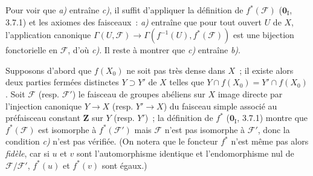 Pour voir que \emph{a)} entraîne \emph{c)}, il suffit d'appliquer la définition
de $f^*(\mathcal F)$ ($\mathbf 0_{\mathrm I}$, 3.7.1) et les axiomes des
faisceaux~: \emph{a)} entraîne que pour tout ouvert $U$ de $X$, l'application
canonique
$\Gamma(U,\mathcal F)\to\Gamma(f^{-1}(U),f^*(\mathcal F))$ est une bijection
fonctorielle en $\mathcal F$, d'où \emph{c)}. Il reste à montrer que
\emph{c)} entraîne \emph{b)}.

Supposons d'abord que $f(X_0)$ ne soit pas très dense dans $X$~; il existe
alors deux parties fermées distinctes $Y\supset Y'$ de $X$ telles que
$Y\cap f(X_0)=Y'\cap f(X_0)$. Soit $\mathcal F$ (resp. $\mathcal F'$) le
faisceau de groupes abéliens sur $X$ image directe par l'injection canonique
$Y\to X$ (resp. $Y'\to X$) du faisceau simple associé au préfaisceau constant
$\mathbf Z$ sur $Y$ (resp. $Y'$)~; la définition de $f^*$
($\mathbf 0_{\mathrm I}$, 3.7.1) montre que $f^*(\mathcal F)$ est isomorphe à
$f^*(\mathcal F')$ mais $\mathcal F$ n'est pas isomorphe à $\mathcal F'$,
donc la condition \emph{c)} n'est pas vérifiée. (On notera que le foncteur
$f^*$ n'est même pas alors \emph{fidèle}, car si $u$ et $v$ sont
l'automorphisme identique et l'endomorphisme nul de $\mathcal F/\mathcal F'$,
$f^*(u)$ et $f^*(v)$ sont égaux.)


